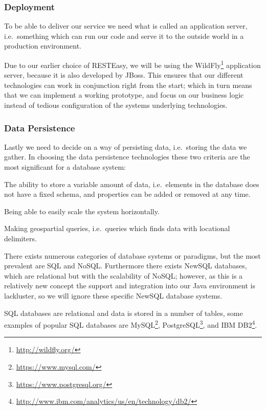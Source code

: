 \subsubsection{Deployment}
To be able to deliver our service we need what is called an application server, i.e.~something which can run our code and serve it to the outside world in a production environment.

Due to our earlier choice of RESTEasy, we will be using the WildFly\footnote{\url{http://wildfly.org/}} application server, because it is also developed by JBoss.
This ensures that our different technologies can work in conjunction right from the start;
which in turn means that we can implement a working prototype, and focus on our business logic instead of tedious configuration of the systems underlying technologies.

\subsubsection{Data Persistence}
Lastly we need to decide on a way of persisting data, i.e.~storing the data we gather.
In choosing the data persistence technologies these two criteria are the most significant for a database system:
\begin{eletterate}
    \item The ability to store a variable amount of data, i.e.~elements in the database does not have a fixed schema, and properties can be added or removed at any time.
    \item Being able to easily scale the system horizontally.
    \item Making geospartial queries, i.e.~queries which finds data with locational delimiters.
\end{eletterate}

\bigskip
There exists numerous categories of database systems or paradigms, but the most prevalent are SQL and NoSQL.
Furthermore there exists NewSQL databases, which are relational but with the scalability of NoSQL;
however, as this is a relatively new concept the support and integration into our Java environment is lackluster, so we will ignore these specific NewSQL database systems.

SQL databases are relational and data is stored in a number of tables, some examples of popular SQL databases are MySQL\footnote{\url{https://www.mysql.com/}}, PostgreSQL\footnote{\url{https://www.postgresql.org/}}, and IBM DB2\footnote{\url{http://www.ibm.com/analytics/us/en/technology/db2/}}.\cite{DB_RANKINGS}

